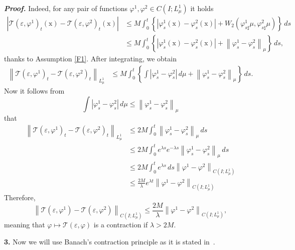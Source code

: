 \documentclass[sn-mathphys-num]{sn-jnl}
\numberwithin{equation}{section}
\theoremstyle{mythm}
\theoremstyle{mydef}
\renewenvironment{proof}{\smallskip\noindent\emph{\textbf{Proof.}}%
  \hspace{1pt}}{\hspace{-5pt}{\nobreak\quad\nobreak\hfill\nobreak%
    $\square$\vspace{2pt}\par}\smallskip\goodbreak}
\renewcommand{\phi}{\varphi}
\renewcommand{\d}{\,d}
\begin{document}
\begin{proof}
Indeed, for any pair of functions \( \phi^{1},\phi^{2} \in C(I;{L}^1_{\mu})\) it holds
\begin{align*}
  \left| \mathcal{T}(\varepsilon,\phi^1)_t(\mathrm{x}) - \mathcal{T}(\varepsilon,\phi^2)_t(\mathrm{x})\right|
  &\le M\int_0^t\left\{|\phi^1_s(\mathrm{x}) - \phi^2_s(\mathrm{x})| + W_2\left(\phi^1_{s\sharp}\mu,\phi^2_{s\sharp}\mu\right)\right\}\d s\\
  &\le M\int_0^t\left\{|\phi^1_s(\mathrm{x}) - \phi^2_s(\mathrm{x})| + \left\|\phi^1_{s}-\phi^2_{s}\right\|_{\mu}\right\}\d s,
\end{align*}
thanks to Assumption \ref{F1}.
After integrating, we obtain
\begin{align*}
  \left\| \mathcal{T}(\varepsilon,\phi^1)_t - \mathcal{T}(\varepsilon,\phi^2)_t\right\|_{L^1_\mu}
  &\le M\int_0^t\left\{\int\left|\phi^1_s - \phi^2_s\right|\d \mu + \left\|\phi^1_{s}-\phi^2_{s}\right\|_{\mu}\right\}\d s.
\end{align*}
Now it follows from
\[
\int \left|\phi^1_s-\phi^2_s\right|\d \mu \le \left\|\phi^1_s-\phi^2_s\right\|_{\mu}
\]
that
\begin{align*}
  \left\| \mathcal{T}(\varepsilon,\phi^1)_t - \mathcal{T}(\varepsilon,\phi^2)_t\right\|_{L^1_\mu}
  &\le 2M\int_0^t \left\|\phi^1_{s}-\phi^2_{s}\right\|_{\mu}\d s\\
  &\le 2M\int_0^t e^{\lambda s} e^{-\lambda s}\left\|\phi^1_{s}-\phi^2_{s}\right\|_{\mu}\d s\\
  &\le 2M\int_0^t e^{\lambda s} \d s \left\|\phi^1-\phi^2\right\|_{C(I;{L}^1_{\mu})}\\
  &\le \frac{2M}{\lambda}e^{\lambda t} \left\|\phi^1-\phi^2\right\|_{C(I;{L}^1_{\mu})}
\end{align*}
Therefore,
\[
  \left\| \mathcal{T}(\varepsilon,\phi^1) - \mathcal{T}(\varepsilon,\phi^2)\right\|_{C(I;{L}^1_{\mu})}\le \frac{2M}{\lambda}\left\|\phi^1-\phi^2\right\|_{C(I;{L}^1_{\mu})},
\]
meaning that \( \varphi\mapsto \mathcal{T}(\varepsilon,\phi) \) is a contraction if \( \lambda > 2M\).

\textbf{3.} Now we will use Banach's contraction principle as it is stated in~\cite[Theorem A.2.1]{ABressan_BPiccoli_2007a}.


\end{proof}
\end{document}
